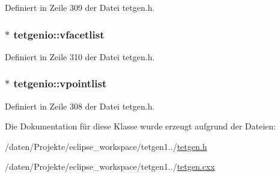 Definiert in Zeile 309 der Datei tetgen.\-h.

\hypertarget{classtetgenio_a14c253eb433eecf874ab4b6fba68c683}{
\subsubsection[{vfacetlist}]{$\ast$ tetgenio\-::vfacetlist}}\label{classtetgenio_a14c253eb433eecf874ab4b6fba68c683}


Definiert in Zeile 310 der Datei tetgen.\-h.

\hypertarget{classtetgenio_afecb51e1302b9006eba50bc2a995b372}{
\subsubsection[{vpointlist}]{$\ast$ tetgenio\-::vpointlist}}\label{classtetgenio_afecb51e1302b9006eba50bc2a995b372}


Definiert in Zeile 308 der Datei tetgen.\-h.



Die Dokumentation für diese Klasse wurde erzeugt aufgrund der Dateien\-:\begin{DoxyCompactItemize}
\item 
/daten/\-Projekte/eclipse\-\_\-workspace/tetgen1../\hyperlink{tetgen_8h}{tetgen.\-h}\item 
/daten/\-Projekte/eclipse\-\_\-workspace/tetgen1../\hyperlink{tetgen_8cxx}{tetgen.\-cxx}\end{DoxyCompactItemize}
